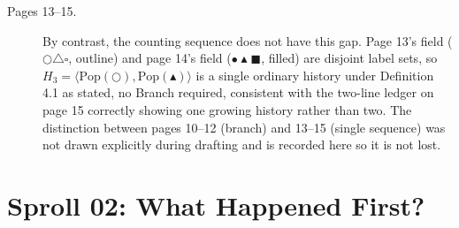 \documentclass[11pt,twoside]{book}
\begin{document}
\begin{description}
\item[Pages 13--15.] By contrast, the counting sequence does not have this gap. Page 13's field ($\bigcirc \triangle \square$, outline) and page 14's field ($\bullet \blacktriangle \blacksquare$, filled) are disjoint label sets, so $H_3 = \langle \mathrm{Pop}(\bigcirc), \mathrm{Pop}(\blacktriangle) \rangle$ is a single ordinary history under Definition 4.1 as stated, no Branch required, consistent with the two-line ledger on page 15 correctly showing one growing history rather than two. The distinction between pages 10--12 (branch) and 13--15 (single sequence) was not drawn explicitly during drafting and is recorded here so it is not lost.
\end{description}

\chapter{Sproll 02: What Happened First?}
\end{document}
